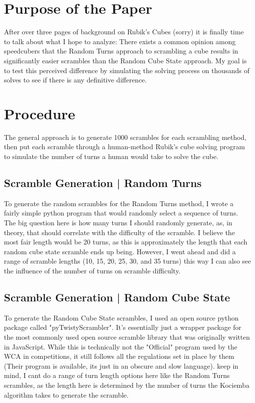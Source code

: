 \documentclass[12pt,letterpaper]{article}
\numberwithin{equation}{section}
\begin{document}
\section{Purpose of the Paper}
After over three pages of background on Rubik's Cubes (sorry) it is finally time to talk about what I hope to analyze: There exists a common opinion among speedcubers that the Random Turns approach to scrambling a cube results in significantly easier scrambles than the Random Cube State approach. My goal is to test this perceived difference by simulating the solving process on thousands of solves to see if there is any definitive difference. 

\section{Procedure}
The general approach is to generate 1000 scrambles for each scrambling method, then put each scramble through a human-method Rubik's cube solving program to simulate the number of turns a human would take to solve the cube. 
\subsection{Scramble Generation | Random Turns}
To generate the random scrambles for the Random Turns method, I wrote a fairly simple python program that would randomly select a sequence of turns. The big question here is how many turns I should randomly generate, as, in theory, that should correlate with the difficulty of the scramble. I believe the most fair length would be 20 turns, as this is approximately the length that each random cube state scramble ends up being. However, I went ahead and did a range of scramble lengths (10, 15, 20, 25, 30, and 35 turns) this way I can also see the influence of the number of turns on scramble difficulty. 

\subsection{Scramble Generation | Random Cube State}
To generate the Random Cube State scrambles, I used an open source python package called "pyTwistyScrambler". It's essentially just a wrapper package for the most commonly used open source scramble library that was originally written in JavaScript. While this is technically not the "Official" program used by the WCA in competitions, it still follows all the regulations set in place by them (Their program is available, its just in an obscure and slow language). keep in mind, I cant do a range of turn length options here like the Random Turns scrambles, as the length here is determined by the number of turns the Kociemba algorithm takes to generate the scramble.  
\end{document}

